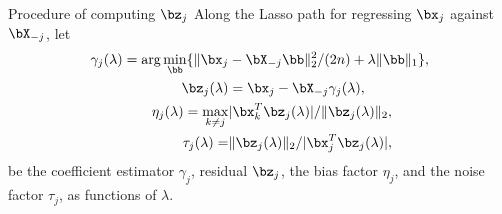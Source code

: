 \begin{frame}
\begin{block}{Procedure of computing $\bz_{j}$}
    Along the Lasso path for regressing $\bx_j$ against $\bX_{-j}$, let
\begin{equation}
\begin{aligned}
\gamma_j(\lambda) = \arg\min_{\bb} \{\|\bx_j & -\bX_{-j}\bb\|_2^2/(2n) + \lambda\|\bb\|_1\}, \\
\bz_j(\lambda)  & = \bx_j-\bX_{-j}\gamma_j(\lambda), \\
\eta_j(\lambda) = \max_{k\neq j} & |\bx_k^T\bz_j(\lambda)|/\|\bz_j(\lambda)\|_2, \\
\tau_j(\lambda)  = & \|\bz_j(\lambda)\|_2/|\bx_j^T\bz_j(\lambda)|, \\
\end{aligned}
\end{equation}
be the coefficient estimator $\gamma_j$, residual $\bz_j$, the bias factor $\eta_j$, and
the noise factor $\tau_j$, as functions of $\lambda$.
\end{block}
\end{frame}



